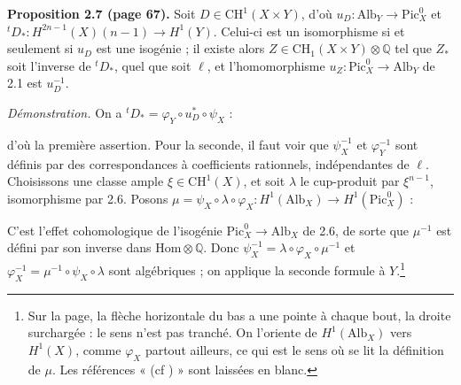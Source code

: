 \documentclass[11pt,a4paper]{article}
\begin{document}
\textbf{Proposition 2.7 (page 67).} Soit $D \in \mathrm{CH}^{1}(X \times Y)$,
d'où $u_{D} \colon \mathrm{Alb}_{Y} \to \mathrm{Pic}^{0}_{X}$ et ${}^{t}D_{*}
\colon H^{2n-1}(X)(n-1) \to H^{1}(Y)$. Celui-ci est un isomorphisme si et
seulement si $u_{D}$ est une isogénie ; il existe alors $Z \in \mathrm{CH}_{1}(X
\times Y) \otimes \mathbb{Q}$ tel que $Z_{*}$ soit l'inverse de ${}^{t}D_{*}$,
quel que soit $\ell$, et l'homomorphisme $u_{Z} \colon \mathrm{Pic}^{0}_{X} \to
\mathrm{Alb}_{Y}$ de 2.1 est $u_{D}^{-1}$.

\emph{Démonstration.} On a ${}^{t}D_{*} = \varphi_{Y} \circ u_{D}^{*} \circ
\psi_{X}$ :


d'où la première assertion. Pour la seconde, il faut voir que
$\psi_{X}^{-1}$ et $\varphi_{Y}^{-1}$ sont définis par des correspondances à
coefficients rationnels, indépendantes de $\ell$. Choisissons une classe ample
$\xi \in \mathrm{CH}^{1}(X)$, et soit $\lambda$ le cup-produit par $\xi^{n-1}$,
isomorphisme par 2.6. Posons $\mu = \psi_{X} \circ \lambda \circ \varphi_{X}
\colon H^{1}(\mathrm{Alb}_{X}) \to H^{1}(\mathrm{Pic}^{0}_{X})$ :


C'est l'effet cohomologique de l'isogénie $\mathrm{Pic}^{0}_{X} \to
\mathrm{Alb}_{X}$ de 2.6, de sorte que $\mu^{-1}$ est défini par son inverse dans
$\mathrm{Hom} \otimes \mathbb{Q}$. Donc $\psi_{X}^{-1} = \lambda \circ \varphi_{X}
\circ \mu^{-1}$ et $\varphi_{X}^{-1} = \mu^{-1} \circ \psi_{X} \circ \lambda$ sont
algébriques ; on applique la seconde formule à $Y$.\footnote{Sur la page, la
flèche horizontale du bas a une pointe à chaque bout, la droite surchargée :
le sens n'est pas tranché. On l'oriente de $H^{1}(\mathrm{Alb}_{X})$ vers
$H^{1}(X)$, comme $\varphi_{X}$ partout ailleurs, ce qui est le sens où se lit
la définition de $\mu$. Les références « (cf ) » sont laissées en blanc.}
\end{document}
